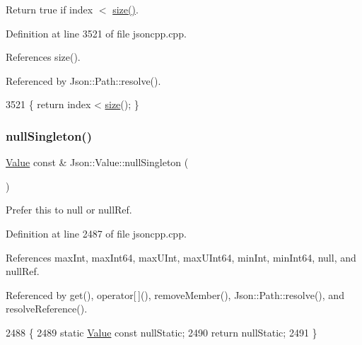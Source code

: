 Return true if index $<$ \hyperlink{class_json_1_1_value_a0ec2808e1d7efa4e9fad938d6667be44}{size()}. 



Definition at line 3521 of file jsoncpp.\+cpp.



References size().



Referenced by Json\+::\+Path\+::resolve().


\begin{DoxyCode}
3521 \{ \textcolor{keywordflow}{return} index < \hyperlink{class_json_1_1_value_a0ec2808e1d7efa4e9fad938d6667be44}{size}(); \}
\end{DoxyCode}
\mbox{\label{class_json_1_1_value_af2f124567acc35d021a424e53ebdfcab}} 
\subsubsection{\texorpdfstring{null\+Singleton()}{nullSingleton()}}
{\footnotesize\ttfamily \hyperlink{class_json_1_1_value}{Value} const  \& Json\+::\+Value\+::null\+Singleton (\begin{DoxyParamCaption}{ }\end{DoxyParamCaption})\hspace{0.3cm}{\ttfamily [static]}}



Prefer this to null or null\+Ref. 



Definition at line 2487 of file jsoncpp.\+cpp.



References max\+Int, max\+Int64, max\+U\+Int, max\+U\+Int64, min\+Int, min\+Int64, null, and null\+Ref.



Referenced by get(), operator\mbox{[}$\,$\mbox{]}(), remove\+Member(), Json\+::\+Path\+::resolve(), and resolve\+Reference().


\begin{DoxyCode}
2488 \{
2489  \textcolor{keyword}{static} \hyperlink{class_json_1_1_value_ada6ba1369448fb0240bccc36efaa46f7}{Value} \textcolor{keyword}{const} nullStatic;
2490  \textcolor{keywordflow}{return} nullStatic;
2491 \}
\end{DoxyCode}
\mbox{\label{class_json_1_1_value_a731b89fb4764c39ce2328e1707c822b9}} 
